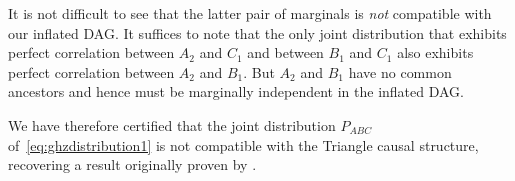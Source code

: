 It is not difficult to see that the latter pair of marginals is \emph{not} compatible with our inflated DAG. It suffices to note that the only joint distribution that exhibits perfect correlation between $A_2$ and $C_1$ and between $B_1$ and $C_1$ also exhibits perfect correlation between $A_2$ and $B_1$.  But $A_2$ and $B_1$ have no common ancestors and hence must be marginally independent in the inflated DAG.

We have therefore certified that the joint distribution $P_{A B C}$ of~\cref{eq:ghzdistribution1} is not compatible with the Triangle causal structure, recovering a result originally proven by \citet{steudel2010ancestors}.

